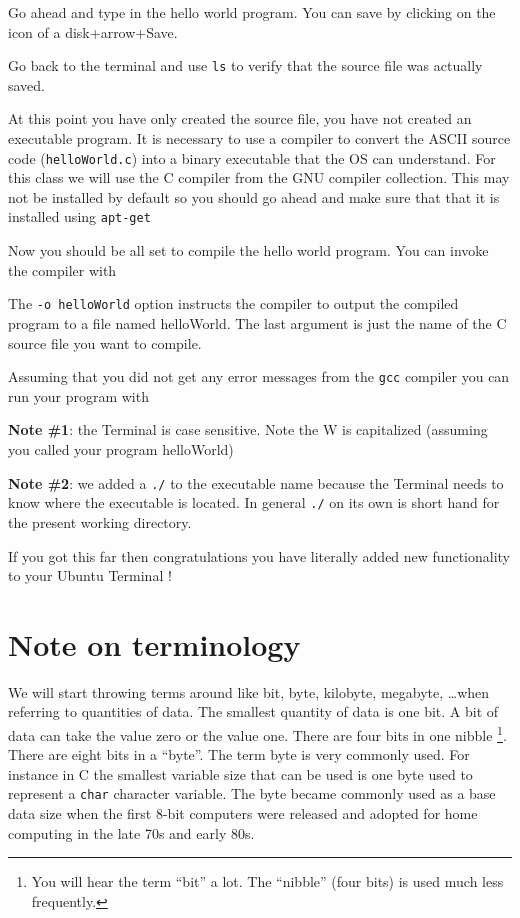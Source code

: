 Go ahead and type in the hello world program. You can save by clicking on the icon of a disk+arrow+Save. 

Go back to the terminal and use \texttt{ls} to verify that the source file was actually saved. 

At this point you have only created the source file, you have not created an executable program. It is necessary to use a compiler to convert the ASCII source code (\texttt{helloWorld.c}) into a binary executable that the OS can understand. For this class we will use the C compiler from the GNU compiler collection. This may not be installed by default so you should go ahead and make sure that that it is installed using \texttt{apt-get}


Now you should be all set to compile the hello world program. You can invoke the compiler with 


The \texttt{-o helloWorld} option instructs the compiler to output the compiled program to a file named helloWorld. The last argument is just the name of the C source file you want to compile.

Assuming that you did not get any error messages from the \texttt{gcc} compiler you can run your program with


{\bf Note \#1}: the Terminal is case sensitive. Note the W is capitalized (assuming you called your program helloWorld)

{\bf Note \#2}: we added a \texttt{./} to the executable name because the Terminal needs to know where the executable is located. In general \texttt{./} on its own is short hand for the present working directory.


If you got this far then congratulations you have literally added new functionality to your Ubuntu Terminal !

\newpage
\section{Note on terminology}
\label{dataSizes.sec}
We will start throwing terms around like bit, byte, kilobyte, megabyte, \ldots when referring to quantities of data. The smallest quantity of data is one bit. A bit of data can take the value zero or the value one. There are four bits in one nibble \footnote{You will hear the term ``bit'' a lot. The ``nibble'' (four bits) is used much less frequently.}. There are eight bits in a ``byte''. The term byte is very commonly used. For instance in C the smallest variable size that can be used is one byte used to represent a \texttt{char} character variable. The byte became commonly used as a base data size when the first 8-bit computers were released and adopted for home computing in the late 70s and early 80s.

